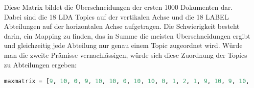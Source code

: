 \documentclass[german,version-2020-11]{uzl-thesis}
\begin{document}
\begin{enumerate}



Diese Matrix bildet die Überschneidungen der ersten 1000 Dokumenten dar. Dabei sind die 18 LDA Topics auf der vertikalen Achse und die 18 LABEL Abteilungen auf der horizontalen Achse aufgetragen. Die Schwierigkeit besteht darin, ein Mapping zu finden, das in Summe die meisten Überschneidungen ergibt und gleichzeitig jede Abteilung nur genau einem Topic zugeordnet wird. Würde man die zweite Prämisse vernachlässigen, würde sich diese Zuordnung der Topics zu Abteilungen ergeben: \\

\begin{lstlisting}[language=Python]
maxmatrix = [9, 10, 0, 9, 10, 10, 0, 10, 10, 0, 1, 2, 1, 9, 10, 9, 10, 9] TODO UPDATEN
\end{lstlisting}\\


\end{enumerate}
\end{document}
